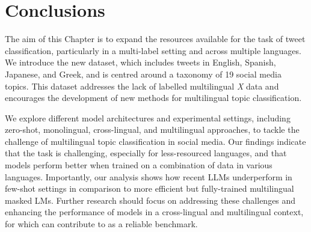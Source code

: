 \begin{table}[]
\centering
{}
\caption{Average macro Precision and Recall scores. Results from the few-shot setting are considered for \textit{chat-gpt} and \textit{gpt-4o}. For the \textit{bernice} and \textit{xlm\_t} results we considered models trained on {\TweetTopic} and {\XTOPIC} }
\label{tab:recall_scores}
\end{table}

\section{Conclusions}
The aim of this Chapter is to expand the resources available for the task of tweet classification, particularly in a multi-label setting and across multiple languages. We introduce the new {\XTOPIC} dataset, which includes tweets in English, Spanish, Japanese, and Greek, and is centred around a taxonomy of 19 social media topics. This dataset addresses the lack of labelled multilingual \textit{X} data and encourages the development of new methods for multilingual topic classification.

We explore different model architectures and experimental settings, including zero-shot, monolingual, cross-lingual, and multilingual approaches, to tackle the challenge of multilingual topic classification in social media. Our findings indicate that the task is challenging, especially for less-resourced languages, and that models perform better when trained on a combination of data in various languages. Importantly, our analysis shows how recent \acp{LLM} underperform in few-shot settings in comparison to more efficient but fully-trained multilingual masked \acp{LM}. Further research should focus on addressing these challenges and enhancing the performance of models in a cross-lingual and multilingual context, for which {\XTOPIC} can contribute to as a reliable benchmark.

